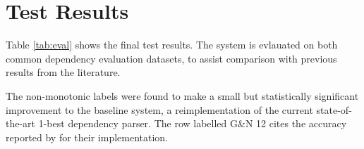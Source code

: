 \documentclass[11pt,letterpaper]{article}
\newcommand{\uas}{\textsc{uas}\xspace}
\begin{document}



\section{Test Results}

Table \ref{tab:eval} shows the final test results. The system is evlauated on
both common dependency evaluation datasets, to assist comparison with previous
results from the literature.

The non-monotonic labels were found to make a small but statistically significant
improvement to the baseline system, a reimplementation of the current state-of-the-art
1-best dependency parser. The row labelled G\&N 12 cites the accuracy reported by
\citet{goldberg:12} for their implementation.

\end{document}
